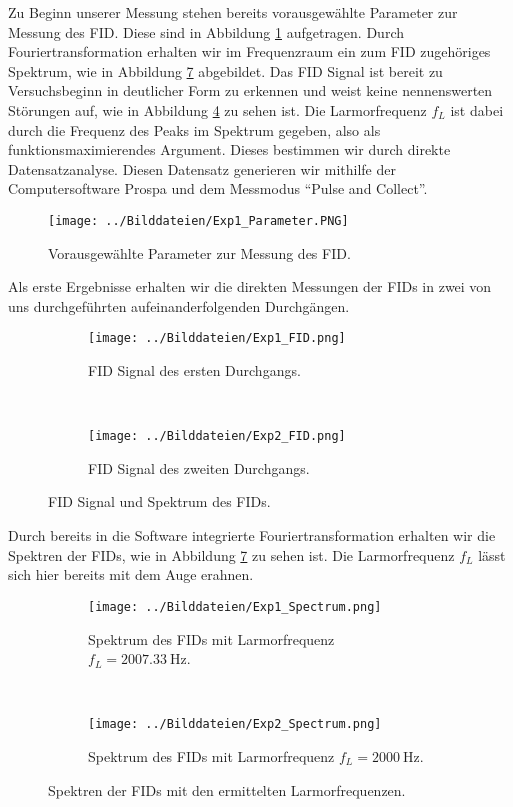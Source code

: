 \documentclass{article}
\begin{document}
    Zu Beginn unserer Messung stehen bereits vorausgewählte Parameter zur Messung des FID. Diese sind in Abbildung \ref{fig:2:Parameter} aufgetragen. Durch Fouriertransformation erhalten wir im Frequenzraum ein zum FID zugehöriges Spektrum, wie in Abbildung \ref{fig:2:Spectrum} abgebildet. Das FID Signal ist bereit zu Versuchsbeginn in deutlicher Form zu erkennen und weist keine nennenswerten Störungen auf, wie in Abbildung \ref{fig:2:FID12} zu sehen ist. Die Larmorfrequenz $f_L$ ist dabei durch die Frequenz des Peaks im Spektrum gegeben, also als funktionsmaximierendes Argument. Dieses bestimmen wir durch direkte Datensatzanalyse. Diesen Datensatz generieren wir mithilfe der Computersoftware Prospa und dem Messmodus \enquote{Pulse and Collect}. 
    \begin{figure}[H]
        \centering
        \texttt{[image: ../Bilddateien/Exp1\_Parameter.PNG]}
        \caption{Vorausgewählte Parameter zur Messung des FID.}
        \label{fig:2:Parameter}
    \end{figure}
    Als erste Ergebnisse erhalten wir die direkten Messungen der FIDs in zwei von uns durchgeführten aufeinanderfolgenden Durchgängen.
    \begin{figure}[H]
        \centering
        \begin{subfigure}[b]{0.4\textwidth}
            \texttt{[image: ../Bilddateien/Exp1\_FID.png]}
            \caption{FID Signal des ersten Durchgangs.}
            \label{fig:2:FID1}
        \end{subfigure}
        \
        \begin{subfigure}[b]{0.4\textwidth}
            \texttt{[image: ../Bilddateien/Exp2\_FID.png]}
            \caption{FID Signal des zweiten Durchgangs.}
            \label{fig:2:FID2}
        \end{subfigure}
        \caption{FID Signal und Spektrum des FIDs.}
        \label{fig:2:FID12}
    \end{figure}
    Durch bereits in die Software integrierte Fouriertransformation erhalten wir die Spektren der FIDs, wie in Abbildung \ref{fig:2:Spectrum} zu sehen ist. Die Larmorfrequenz $f_L$ lässt sich hier bereits mit dem Auge erahnen.
    \begin{figure}[H]
        \centering
        \begin{subfigure}[b]{0.4\textwidth}
            \texttt{[image: ../Bilddateien/Exp1\_Spectrum.png]}
            \caption{Spektrum des FIDs mit Larmorfrequenz $f_L = \SI{2007.33}{\hertz}$.}
            \label{fig:2:Spectrum-1}
        \end{subfigure}
        \
        \begin{subfigure}[b]{0.4\textwidth}
            \texttt{[image: ../Bilddateien/Exp2\_Spectrum.png]}
            \caption{Spektrum des FIDs mit Larmorfrequenz $f_L = \SI{2000}{\hertz}$.}
            \label{fig:2:Spectrum-2}
        \end{subfigure}
        \caption{Spektren der FIDs mit den ermittelten Larmorfrequenzen.}
        \label{fig:2:Spectrum}
    \end{figure}
\end{document}
